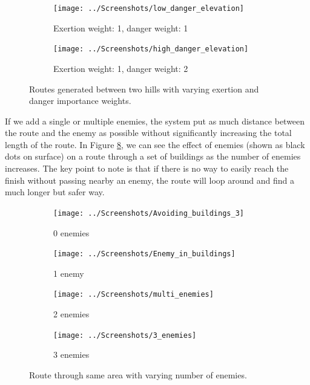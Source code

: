 \documentclass[12pt,a4paper]{article}
\begin{document}
  \begin{figure}[htb]
    \begin{subfigure}{0.5\textwidth}
      \centering
      \texttt{[image: ../Screenshots/low\_danger\_elevation]}
      \caption{Exertion weight: 1, danger weight: 1}
      \label{danger_elevation:low}
    \end{subfigure}
    \begin{subfigure}{0.5\textwidth}
      \centering
      \texttt{[image: ../Screenshots/high\_danger\_elevation]}
      \caption{Exertion weight: 1, danger weight: 2}
      \label{danger_elevation:high}
    \end{subfigure}
    \caption{Routes generated between two hills with varying exertion and danger importance weights.}
    \label{danger_elevation:danger_elevation}
  \end{figure}

  \par If we add a single or multiple enemies, the system put as much distance between the route and the enemy as possible without significantly increasing the total length of the route. In Figure \ref{danger_enemy:danger_enemy}, we can see the effect of enemies (shown as black dots on surface) on a route through a set of buildings as the number of enemies increases. The key point to note is that if there is no way to easily reach the finish without passing nearby an enemy, the route will loop around and find a much longer but safer way.

  \begin{figure}
    \begin{subfigure}{.5\textwidth}
      \centering
      \texttt{[image: ../Screenshots/Avoiding\_buildings\_3]}
      \caption{0 enemies}
      \label{danger_enemy:zero}
    \end{subfigure}
    \begin{subfigure}{.5\textwidth}
      \centering
      \texttt{[image: ../Screenshots/Enemy\_in\_buildings]}
      \caption{1 enemy}
      \label{danger_enemy:one}
    \end{subfigure}
    \begin{subfigure}{.5\textwidth}
      \centering
      \texttt{[image: ../Screenshots/multi\_enemies]}
      \caption{2 enemies}
      \label{danger_enemy:two}
    \end{subfigure}
    \begin{subfigure}{.5\textwidth}
      \centering
      \texttt{[image: ../Screenshots/3\_enemies]}
      \caption{3 enemies}
      \label{danger_enemy:three}
    \end{subfigure}
    \caption{Route through same area with varying number of enemies.}
    \label{danger_enemy:danger_enemy}
  \end{figure}
\end{document}
